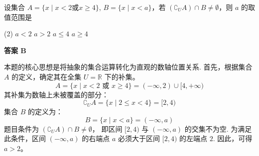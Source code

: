 \begin{choice}[source={2023 秋 · 高一 · 重庆永川区 · 月考校考}, topic={集合的补集与交集}]
设集合 $A=\{x\mid x<2 \text{或} x \ge 4\}$, $B=\{x\mid x<a\}$，若 $(\complement_U A) \cap B \neq \emptyset$，则 $a$ 的取值范围是
\begin{tasks}(2)
	\task $a < 2$
	\task $a > 2$
	\task $a \le 4$
	\task $a \ge 4$
\end{tasks}
\end{choice}
\begin{choice-sol}
\textbf{答案 B}

本题的核心思想是将抽象的集合运算转化为直观的数轴位置关系.
首先，根据集合 $A$ 的定义，确定其在全集 $U=\mathbb{R}$ 下的补集。
\[ A = \{x\mid x<2 \text{ 或 } x \ge 4\} = (-\infty, 2) \cup [4, +\infty) \]
其补集为数轴上未被覆盖的部分：
\[ \complement_U A = \{x\mid 2 \le x < 4\} = [2, 4) \]
集合 $B$ 的定义为：
\[ B = \{x\mid x<a\} = (-\infty, a) \]
题目条件为 $(\complement_U A) \cap B \neq \emptyset$，
即区间 $[2, 4)$ 与 $(-\infty, a)$ 的交集不为空.
为满足此条件，区间 $(-\infty, a)$ 的右端点 $a$
必须大于区间 $[2,4)$ 的左端点 $2$.
因此，可得 $a > 2$。
\end{choice-sol}
